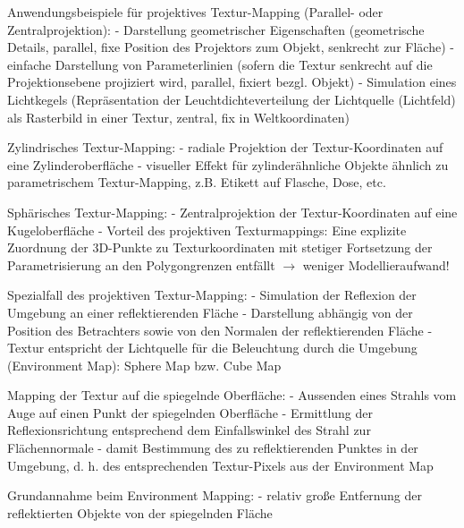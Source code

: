 \documentclass[10pt,landscape]{article}
\begin{document}
\begin{multicols}{3}
  Anwendungsbeispiele für projektives Textur-Mapping (Parallel- oder Zentralprojektion):
  - Darstellung geometrischer Eigenschaften (geometrische Details, parallel, fixe Position des Projektors zum Objekt, senkrecht zur Fläche)
  - einfache Darstellung von Parameterlinien (sofern die Textur senkrecht auf die Projektionsebene projiziert wird, parallel, fixiert bezgl. Objekt)
  - Simulation eines Lichtkegels (Repräsentation der Leuchtdichteverteilung der Lichtquelle (Lichtfeld) als Rasterbild in einer Textur, zentral, fix in Weltkoordinaten)
  
  Zylindrisches Textur-Mapping:
  - radiale Projektion der Textur-Koordinaten auf eine Zylinderoberfläche
  - visueller Effekt für zylinderähnliche Objekte ähnlich zu parametrischem Textur-Mapping, z.B. Etikett auf Flasche, Dose, etc.
  
  Sphärisches Textur-Mapping:
  - Zentralprojektion der Textur-Koordinaten auf eine Kugeloberfläche
  - Vorteil des projektiven Texturmappings: Eine explizite Zuordnung der 3D-Punkte zu Texturkoordinaten mit stetiger Fortsetzung der Parametrisierung an den Polygongrenzen entfällt $\rightarrow$ weniger Modellieraufwand!
  
  Spezialfall des projektiven Textur-Mapping:
  - Simulation der Reflexion der Umgebung an einer reflektierenden Fläche
  - Darstellung abhängig von der Position des Betrachters sowie von den Normalen der reflektierenden Fläche
  - Textur entspricht der Lichtquelle für die Beleuchtung durch die Umgebung (Environment Map): Sphere Map bzw. Cube Map
  
  Mapping der Textur auf die spiegelnde Oberfläche:
  - Aussenden eines Strahls vom Auge auf einen Punkt der spiegelnden Oberfläche
  - Ermittlung der Reflexionsrichtung entsprechend dem Einfallswinkel des Strahl zur Flächennormale
  - damit Bestimmung des zu reflektierenden Punktes in der Umgebung, d. h. des entsprechenden Textur-Pixels aus der Environment Map
  
  Grundannahme beim Environment Mapping:
  - relativ große Entfernung der reflektierten Objekte von der spiegelnden Fläche
  

\end{multicols}
\end{document}
